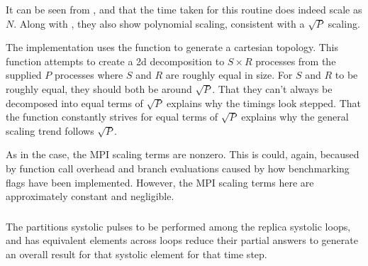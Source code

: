 \vZeroTimeExplanation
    {}
    {}
    {}
    {\individualoperation{}}
    {\replicatedsystolicloop{}}

%
It can be seen from
,
 and
that the time taken for this routine does indeed scale as $N$.
%
Along with 
,
they also show polynomial scaling, consistent with a $\sqrt{P}$ scaling.

The implementation uses the \mpidimscreate{} function to generate a
cartesian topology.
%
This function attempts to create a 2d decomposition to $S \times{} R$
processes from the supplied $P$ processes where $S$ and $R$ are roughly
equal in size.
%
For $S$ and $R$ to be roughly equal, they should both be around $\sqrt{P}$.
%
That they can't always be decomposed into equal terms of $\sqrt{P}$
explains why the timings look stepped.
%
That the function constantly strives for equal terms of $\sqrt{P}$
explains why the general scaling trend follows $\sqrt{P}$.

As in the \systolicloop{} case, the MPI scaling terms are nonzero.
%
This is could, again, becaused by function call overhead and
branch evaluations caused by how benchmarking flags have been implemented.
%
However, the MPI scaling terms here are approximately constant and negligible.


\subsubsection{\pairoperation{}}

The \pairoperation{} partitions systolic pulses to be performed among
the replica systolic loops, and has equivalent elements across loops
reduce their partial answers to generate an overall result for that
systolic element for that time step.

%
%
\begin{figure}[!h]
    
    \caption{
        \vZeroSpeedupCaption
            {\replicatedsystolicloop{}}
            {\pairoperation{}}
    }
    \label{fig:v1_replicated_systolic_pair_operation_speedups}
\end{figure}


